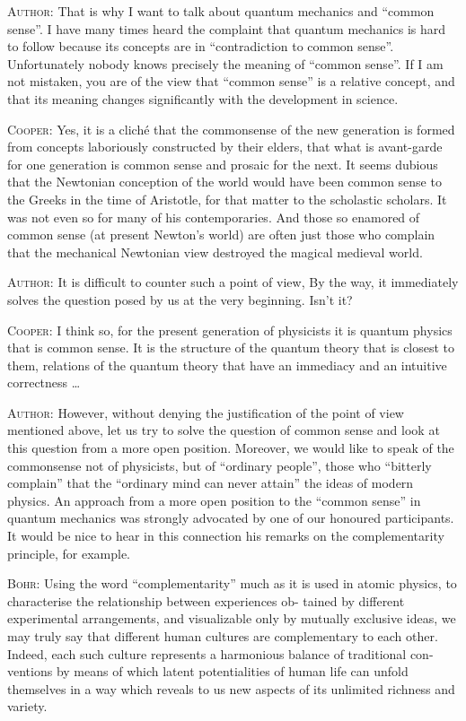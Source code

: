 \documentclass[a4paper,sfsidenotes,colorlinks=true]{tufte-book}
\numberwithin{equation}{section}
\numberwithin{figure}{section}
\begin{document}
\textsc{Author:} That is why I want to talk about quantum mechanics and ``common
sense''. I have many times heard the complaint that quantum mechanics
is hard to follow because its concepts are in ``contradiction to
common sense''. Unfortunately nobody knows precisely the meaning of
``common sense''. If I am not mistaken, you are of the view that
``common sense'' is a relative concept, and that its meaning changes
significantly with the development in science.


\textsc{Cooper:} Yes, it is a clich\'e that the commonsense of the new generation is formed from concepts laboriously constructed by their elders, that what is avant-garde for one generation is common sense and prosaic for the next. It seems dubious that the Newtonian conception of the world would have been common sense to the Greeks in the time of Aristotle, for that matter to the scholastic scholars. It was not even so for many of his contemporaries. And those so enamored of common sense (at present Newton's world) are often just those who complain that the mechanical Newtonian view destroyed the magical medieval world.

\textsc{Author:} It is difficult to counter such a point of view, By the way, it immediately solves the question posed by us at the very beginning. Isn't it?

\textsc{Cooper:} I think so, for the present generation of physicists it is quantum
physics that is common sense. It is the structure of the quantum
theory that is closest to them, relations of the quantum theory that
have an immediacy and an intuitive correctness \ldots

\textsc{Author:} However, without denying the justification of the point of view
mentioned above, let us try to solve the question of common sense and
look at this question from a more open position. Moreover, we would
like to speak of the commonsense not of physicists, but of ``ordinary
people'', those who ``bitterly complain'' that the ``ordinary mind can
never attain'' the ideas of modern physics. An approach from a more
open position to the ``common sense'' in quantum mechanics was strongly
advocated by one of our honoured participants. It would be nice to
hear in this connection his remarks on the complementarity principle,
for example.  

\textsc{Bohr:} Using the word ``complementarity'' much as it is used in
atomic physics, to characterise the relationship between experiences
ob- tained by different experimental arrangements, and visualizable
only by mutually exclusive ideas, we may truly say that different
human cultures are complementary to each other. Indeed, each such
culture represents a harmonious balance of traditional con- ventions
by means of which latent potentialities of human life can unfold
themselves in a way which reveals to us new aspects of its unlimited
richness and variety.  
\end{document}
